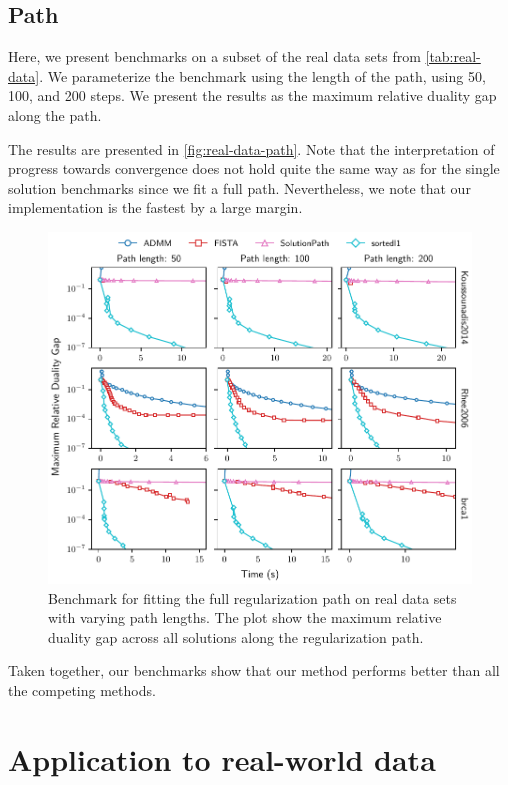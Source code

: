 \documentclass[article]{jss}
\makeatletter
\let\natwidth\Gin@nat@width
\makeatother
\begin{document}
\subsection{Path}\label{sec:path-benchmark}

Here, we present benchmarks
on a subset of the real data sets from \autoref{tab:real-data}. We parameterize
the benchmark using the length of the path, using 50, 100, and 200 steps. We
present the results as the maximum relative duality gap along the path.

The results are presented in \autoref{fig:real-data-path}. Note that the interpretation
of progress towards convergence does not hold quite the same way as for the single
solution benchmarks since we fit a full path. Nevertheless, we note that our
implementation is the fastest by a large margin.

\begin{figure}[tp]
  \centering
  \includegraphics[width=\natwidth]{images/benchmark_path_real.pdf}
  \caption{%
    Benchmark for fitting the full regularization path on real data sets with
    varying path lengths. The plot show the maximum relative duality gap across all
    solutions along the regularization path.
  }
  \label{fig:real-data-path}
\end{figure}

Taken together, our benchmarks show that our method performs better
than all the competing methods.

\section{Application to real-world data}\label{sec:realdat}
\end{document}
